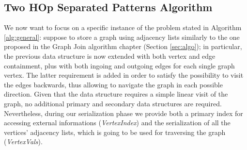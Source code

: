 
\subsection{Two HOp Separated Patterns Algorithm}\label{sec:THOSPA}
We now want to focus on a specific instance of the problem stated in Algorithm \ref{alg:general}: suppose to store a graph using adjacency lists similarly to the one proposed in the Graph Join algorithm chapter (Section \vref{sec:algo}); in particular, the previous data structure is now extended with both vertex and edge containment, plus with both ingoing and outgoing edges for each single graph vertex. The latter requirement is added in order to satisfy the possibility to visit the edges backwards, thus allowing to navigate the graph in each possible direction. 
Given that the data structure requires a simple linear visit of the graph, no additional primary and secondary data structures are required. Nevertheless, during our serialization phase we provide both a primary index for accessing external informations (\textit{VertexIndex}) and the serialization of all the vertices' adjacency lists, which is going to be used for traversing the graph (\textit{VertexVals}). 


